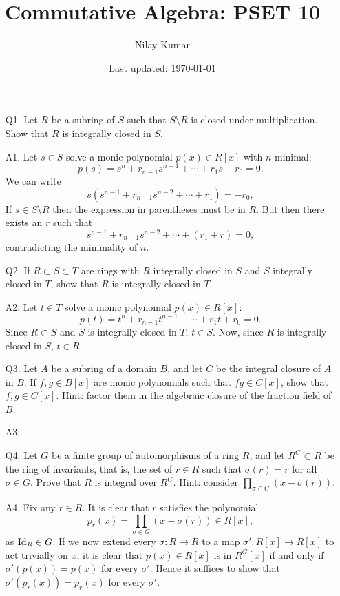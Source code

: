 \documentclass{../mathnotes}
\title{Commutative Algebra: PSET 10}
\author{Nilay Kumar}
\date{Last updated: \today}
\begin{document}
\maketitle

\begin{enumerate}
    \item[Q1.] Let $R$ be a subring of $S$ such that $S\setminus R$ is closed under multiplication.
        Show that $R$ is integrally closed in $S$.
    \item[A1.] Let $s\in S$ solve a monic polynomial $p(x)\in R[x]$ with $n$ minimal:
        \[p(s)=s^n+r_{n-1}s^{n-1}+\cdots+r_1s+r_0=0.\]
        We can write
        \[s(s^{n-1}+r_{n-1}s^{n-2}+\cdots+r_1)=-r_0,\]
        If $s\in S\setminus R$ then the expression in parentheses must be in $R$. But then
        there exists an $r$ such that
        \[s^{n-1}+r_{n-1}s^{n-2}+\cdots+(r_1+r)=0,\]
        contradicting the minimality of $n$.
    \item[Q2.] If $R\subset S\subset T$ are rings with $R$ integrally closed in $S$ and $S$ integrally
        closed in $T$, show that $R$ is integrally closed in $T$.
    \item[A2.] Let $t\in T$ solve a monic polynomial $p(x)\in R[x]$:
        \[p(t)=t^n+r_{n-1}t^{n-1}+\cdots+r_1t+r_0=0.\]
        Since $R\subset S$ and $S$ is integrally closed in $T$, $t\in S$. Now, since $R$ is integrally
        closed in $S$, $t\in R$.
    \item[Q3.] Let $A$ be a subring of a domain $B$, and let $C$ be the integral closure of $A$ in $B$.
        If $f,g\in B[x]$ are monic polynomials such that $fg\in C[x]$, show that $f,g\in C[x]$. Hint:
        factor them in the algebraic closure of the fraction field of $B$.
    \item[A3.]
    \item[Q4.] Let $G$ be a finite group of automorphisms of a ring $R$, and let $R^G\subset R$ be the
        ring of invariants, that is, the set of $r\in R$ such that $\sigma(r)=r$ for all $\sigma\in G$.
        Prove that $R$ is integral over $R^G$. Hint: consider $\prod_{\sigma\in G}(x-\sigma(r))$.
    \item[A4.] Fix any $r\in R$. It is clear that $r$ satisfies the polynomial
        \[p_r(x)=\prod_{\sigma\in G}(x-\sigma(r))\in R[x],\]
        as $\operatorname{Id}_R\in G$. If we now extend every $\sigma:R\to R$ to a map $\sigma':R[x]\to R[x]$ to act
        trivially on $x$, it is clear that $p(x)\in R[x]$ is in $R^G[x]$ if and only if $\sigma'(p(x))=p(x)$
        for every $\sigma'$. Hence it suffices to show that $\sigma'(p_r(x))=p_r(x)$ for every $\sigma'$.

\end{enumerate}
\end{document}
